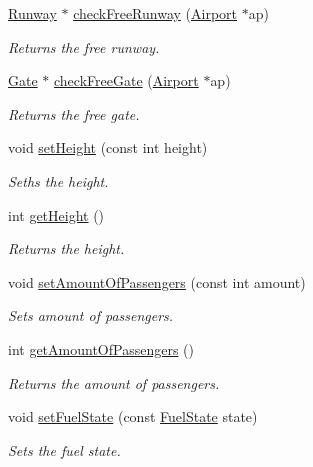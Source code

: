 \begin{DoxyCompactItemize}
\mbox{\hyperlink{class_runway}{Runway}} $\ast$ \mbox{\hyperlink{class_airplane_a8147ddb6b797ef4d7d23c749b1d323f2}{check\+Free\+Runway}} (\mbox{\hyperlink{class_airport}{Airport}} $\ast$ap)
\begin{DoxyCompactList}\small\item\em Returns the free runway. \end{DoxyCompactList}\item 
\mbox{\hyperlink{class_gate}{Gate}} $\ast$ \mbox{\hyperlink{class_airplane_abe2aa4a30f2ba93153ab31e9b7a6be21}{check\+Free\+Gate}} (\mbox{\hyperlink{class_airport}{Airport}} $\ast$ap)
\begin{DoxyCompactList}\small\item\em Returns the free gate. \end{DoxyCompactList}\item 
void \mbox{\hyperlink{class_airplane_ac6fe4a772e91b595cbadbc04851c7006}{set\+Height}} (const int height)
\begin{DoxyCompactList}\small\item\em Seths the height. \end{DoxyCompactList}\item 
int \mbox{\hyperlink{class_airplane_a2e4bec29526f4c1996aaf199c35484b3}{get\+Height}} ()
\begin{DoxyCompactList}\small\item\em Returns the height. \end{DoxyCompactList}\item 
void \mbox{\hyperlink{class_airplane_aef14274f9efcb774d48b1557f6fc6b70}{set\+Amount\+Of\+Passengers}} (const int amount)
\begin{DoxyCompactList}\small\item\em Sets amount of passengers. \end{DoxyCompactList}\item 
int \mbox{\hyperlink{class_airplane_acb38911857c36d345cf3c02462894b2b}{get\+Amount\+Of\+Passengers}} ()
\begin{DoxyCompactList}\small\item\em Returns the amount of passengers. \end{DoxyCompactList}\item 
void \mbox{\hyperlink{class_airplane_a29757f797880dacd6505bf072291740d}{set\+Fuel\+State}} (const \mbox{\hyperlink{class_airplane_ad17ce69f4dd39704789158c726f5bf45}{Fuel\+State}} state)
\begin{DoxyCompactList}\small\item\em Sets the fuel state. \end{DoxyCompactList}\item 

\end{DoxyCompactItemize}
